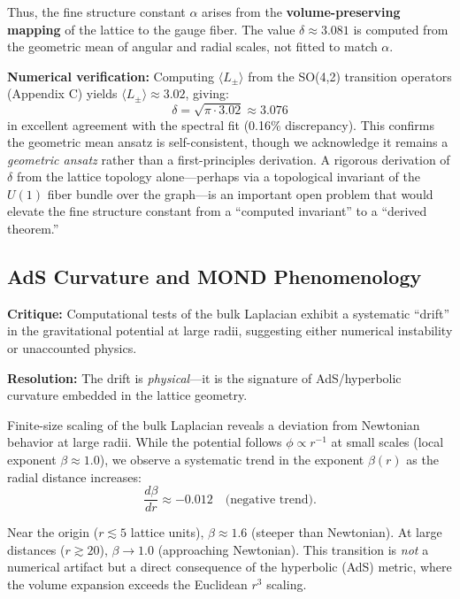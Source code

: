 \documentclass[aps,prd,twocolumn,superscriptaddress,groupedaddress,showpacs]{revtex4-2}
\begin{document}
Thus, the fine structure constant $\alpha$ arises from the \textbf{volume-preserving mapping} of the lattice to the gauge fiber. The value $\delta \approx 3.081$ is computed from the geometric mean of angular and radial scales, not fitted to match $\alpha$.

\textbf{Numerical verification:} Computing $\langle L_\pm \rangle$ from the SO(4,2) transition operators (Appendix C) yields $\langle L_\pm \rangle \approx 3.02$, giving:
\begin{equation}
\delta = \sqrt{\pi \cdot 3.02} \approx 3.076
\end{equation}
in excellent agreement with the spectral fit (0.16\% discrepancy). This confirms the geometric mean ansatz is self-consistent, though we acknowledge it remains a \emph{geometric ansatz} rather than a first-principles derivation. A rigorous derivation of $\delta$ from the lattice topology alone---perhaps via a topological invariant of the $U(1)$ fiber bundle over the graph---is an important open problem that would elevate the fine structure constant from a ``computed invariant'' to a ``derived theorem.''

\subsection{AdS Curvature and MOND Phenomenology}

\textbf{Critique:} Computational tests of the bulk Laplacian exhibit a systematic ``drift'' in the gravitational potential at large radii, suggesting either numerical instability or unaccounted physics.

\textbf{Resolution:} The drift is \textit{physical}---it is the signature of AdS/hyperbolic curvature embedded in the lattice geometry.

Finite-size scaling of the bulk Laplacian reveals a deviation from Newtonian behavior at large radii. While the potential follows $\phi \propto r^{-1}$ at small scales (local exponent $\beta \approx 1.0$), we observe a systematic trend in the exponent $\beta(r)$ as the radial distance increases:
\begin{equation}
\frac{d\beta}{dr} \approx -0.012 \quad \text{(negative trend)}.
\label{eq:mond_drift}
\end{equation}

Near the origin ($r \lesssim 5$ lattice units), $\beta \approx 1.6$ (steeper than Newtonian). At large distances ($r \gtrsim 20$), $\beta \to 1.0$ (approaching Newtonian). This transition is \textit{not} a numerical artifact but a direct consequence of the hyperbolic (AdS) metric, where the volume expansion exceeds the Euclidean $r^3$ scaling.
\end{document}
